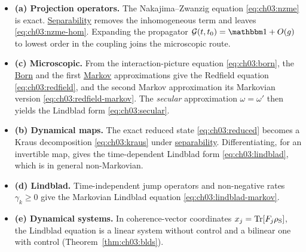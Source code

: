 \documentclass[handoutsbeamer.tex]{subfiles}
\begin{document}
\begin{frame}\mop{\footnotesize}
\begin{itemize}\setlength\itemsep{0.4em}
    \item \textbf{(a) Projection operators.} The Nakajima--Zwanzig equation \eqref{eq:ch03:nzme} is exact. \hyperref[ass:ch03:sep]{Separability} removes the inhomogeneous term and leaves \eqref{eq:ch03:nzme-hom}. Expanding the propagator $\mathcal G(t,t_0)=\Id+O(g)$ to lowest order in the coupling joins the microscopic route.
    \item \textbf{(c) Microscopic.} From the interaction-picture equation \eqref{eq:ch03:born}, the \hyperref[ass:ch03:born]{Born} and the first \hyperref[ass:ch03:markov]{Markov} approximations give the Redfield equation \eqref{eq:ch03:redfield}, and the second Markov approximation its Markovian version \eqref{eq:ch03:redfield-markov}. The \emph{secular} approximation $\omega=\omega'$ then yields the Lindblad form \eqref{eq:ch03:secular}.
    \item \textbf{(b) Dynamical maps.} The exact reduced state \eqref{eq:ch03:reduced} becomes a Kraus decomposition \eqref{eq:ch03:kraus} under \hyperref[ass:ch03:sep]{separability}. Differentiating, for an invertible map, gives the time-dependent Lindblad form \eqref{eq:ch03:lindblad}, which is in general non-Markovian.
    \item \textbf{(d) Lindblad.} Time-independent jump operators and non-negative rates $\gamma_k\ge0$ give the Markovian Lindblad equation \eqref{eq:ch03:lindblad-markov}.
    \item \textbf{(e) Dynamical systems.} In coherence-vector coordinates $x_j=\operatorname{Tr}[F_j\rho_{\mathrm S}]$, the Lindblad equation is a linear system without control and a bilinear one with control (Theorem~\ref{thm:ch03:blds}).
\end{itemize}
\end{frame}
\end{document}
